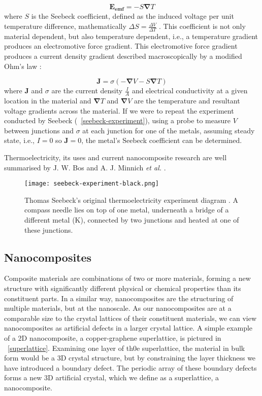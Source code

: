 \documentclass[12pt,draft]{article}
\newcommand{\figref}[2][\figurename~]{#1\ref{#2}}
\renewcommand{\vec}[1]{\mathbf{#1}}
\begin{document}
\begin{equation}
\label{seebeck-emf}
	\vec{E_{emf}} = -S \vec{\nabla} T
\end{equation}
where $S$ is the Seebeck coefficient, defined as the induced voltage per unit temperature difference, mathematically $\Delta S = \frac{\Delta V}{\Delta T}$ \cite{auparay}. This coefficient is not only material dependent, but also temperature dependent, i.e., a temperature gradient produces an electromotive force gradient. This electromotive force gradient produces a current density gradient described macroscopically by a modified Ohm's law \cite{ziman}:

\begin{equation}
\label{current-density}
	\vec{J} = \sigma (-\vec{\nabla} V - S \vec{\nabla} T)
\end{equation}
where $\vec{J}$ and $\sigma$ are the current density $\frac{I}{A}$ and electrical conductivity at a given location in the material and $\vec{\nabla} T$ and $\vec{\nabla} V$ are the temperature and resultant voltage gradients across the material. If we were to repeat the experiment conducted by Seebeck (\figref{seebeck-experiment}), using a probe to measure $V$ between junctions and $\sigma$ at each junction for one of the metals, assuming steady state, i.e., $I=0$ so $\vec{J} = 0$, the metal's Seebeck coefficient can be determined.

Thermoelectricity, its uses and current nanocomposite research are well summarised by J. W. Bos \cite{bos-review} and A. J. Minnich \emph{et al.} \cite{minnich-review}.

\begin{figure}
	\centering
	\texttt{[image: seebeck-experiment-black.png]}
	\caption{Thomas Seebeck's original thermoelectricity experiment diagram \cite{seebeck-original}. A compass needle lies on top of one metal, underneath a bridge of a different metal (K), connected by two junctions and heated at one of these junctions.}
	\label{fig:seebeck-experiment}
\end{figure}

\subsection{Nanocomposites}
Composite materials are combinations of two or more materials, forming a new structure with significantly different physical or chemical properties than its constituent parts. In a similar way, nanocomposites are the structuring of multiple materials, but at the nanoscale. As our nanocomposites are at a comparable size to the crystal lattices of their constituent materials, we can view nanocomposites as artificial defects in a larger crystal lattice. A simple example of a 2D nanocomposite, a copper-graphene superlattice, is pictured in \figref{superlattice}. Examining one layer of th0e superlattice, the material in bulk form would be a 3D crystal structure, but by constraining the layer thickness we have introduced a boundary defect. The periodic array of these boundary defects forms a new 3D artificial crystal, which we define as a superlattice, a nanocomposite.
\end{document}
